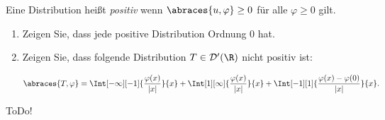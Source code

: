 
\begin{exercise}

Eine Distribution heißt \textit{positiv} wenn $\abraces{u, \varphi} \geq 0$ für alle $\varphi \geq 0$ gilt.

\begin{enumerate}[label = (\roman*)]
    \item Zeigen Sie, dass jede positive Distribution Ordnung $0$ hat.
    \item Zeigen Sie, dass folgende Distribution $T \in \mathcal{D}^\prime(\R)$ nicht positiv ist:
    
    \begin{align*}
        \abraces{T, \varphi}
        =
        \Int[-\infty][-1]
        {
            \frac{\varphi(x)}{|x|}
        }{x}
        +
        \Int[1][\infty]
        {
            \frac{\varphi(x)}{|x|}
        }{x}
        +
        \Int[-1][1]
        {
            \frac{\varphi(x) - \varphi(0)}{|x|}
        }{x}.
    \end{align*}

\end{enumerate}

\end{exercise}


\begin{solution}

ToDo!

\end{solution}

